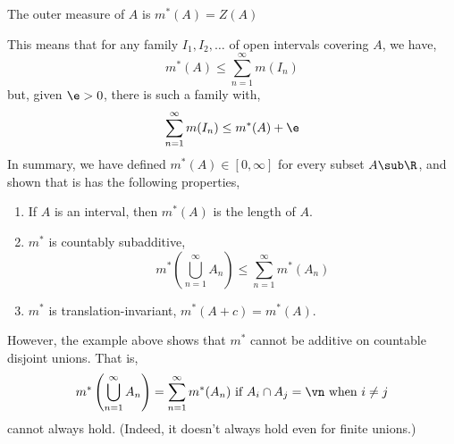 \begin{ndefi}
  The outer measure of $A$ is $m^*(A) = Z(A)$
\end{ndefi}

\noindent
This means that for any family $I_1, I_2, \dots$ of open intervals covering $A$, we have,
$$ m^*(A) \le \sum_{n=1}^\infty m(I_n) $$
but, given $\e > 0$, there is such a family with,
$$ \sum_{n=1}^\infty m(I_n) \le m^*(A) + \e $$
In summary, we have defined $m^*(A) \in [0, \infty]$ for every subset $A \sub \R$, and shown that is has the following properties,
\begin{enumerate}
  \item If $A$ is an interval, then $m^*(A)$ is the length of $A$.
  \item $m^*$ is countably subadditive,
  $$ m^*\left( \bigcup_{n=1}^\infty A_n \right) \le \sum_{n=1}^\infty m^*(A_n) $$
  \item $m^*$ is translation-invariant, $m^*(A + c) = m^*(A)$.
\end{enumerate}

\noindent
However, the example above shows that $m^*$ cannot be additive on countable disjoint unions. That is,
$$ m^*\left( \bigcup_{n=1}^\infty A_n \right) = \sum_{n=1}^\infty m^*(A_n) \text{ if } A_i \cap A_j = \vn \text{ when } i \ne j $$
cannot always hold. (Indeed, it doesn't always hold even for finite unions.)